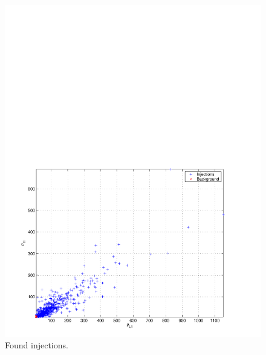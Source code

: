 \begin{figure}[p]
\begin{center}
\includegraphics[width=\textwidth]{figures/result/bkg_inj}
\end{center}
\caption{\label{f:bkg_hist}%
Found injections.
}
\end{figure}

